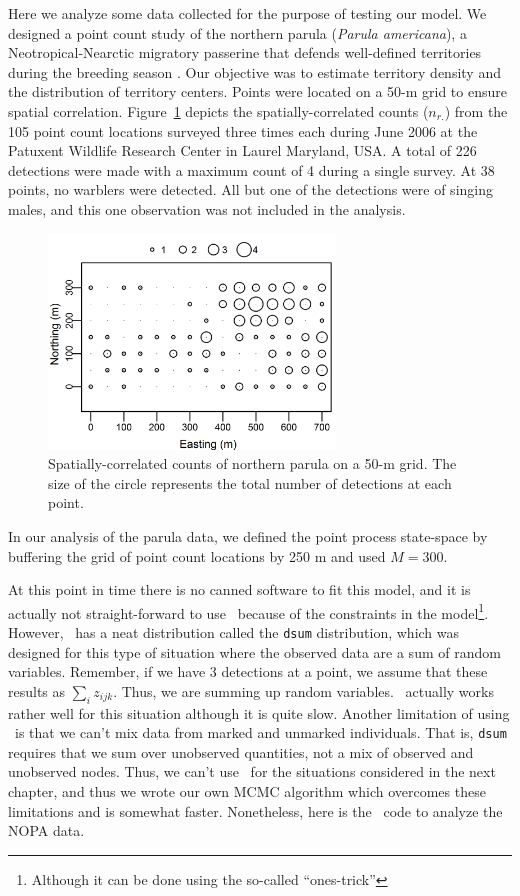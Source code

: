 Here we analyze some data collected for the purpose of testing our
model. We designed a point
count study of the northern parula ({\it Parula americana}), a
Neotropical-Nearctic migratory passerine that defends
well-defined territories during the breeding season
\citep{moldenhaer_regelski:1996}. Our objective was to
estimate territory density and the distribution of territory centers. Points
were located on a 50-m grid to ensure spatial
correlation. Figure~\ref{fig:nopaDat} depicts the spatially-correlated
counts ($n_{r.}$) from the 105 point count locations
surveyed three times each during June 2006
at the Patuxent Wildlife Research Center in Laurel Maryland, USA.
A total of 226 detections were made with a maximum count of 4 during a
single survey. At 38 points, no warblers were detected. All but one of
the detections were of singing males, and this one observation was
not included in the analysis.


\begin{figure}
  \centering
  \includegraphics[width=3in,height=2.25in]{Ch14/figs/nopa}
  \caption{Spatially-correlated counts of northern parula on a 50-m
    grid. The size of the circle represents the total number of
    detections at each point.}
  \label{fig:nopaDat}
\end{figure}



In our analysis of the parula data, we defined the point process
state-space by buffering the grid of point
count locations by 250 m and used $M=300$.

At this point in time there is no canned software to fit this model,
and it is actually not straight-forward to use \bugs~because of the
constraints in the model\footnote{Although it can be done using the
  so-called ``ones-trick''}. However, \jags~has a neat distribution
called the \verb+dsum+ distribution, which was designed for this type
of situation where the observed data are a sum of random
variables. Remember, if we have 3 detections at a point, we assume
that these results as $\sum_i z_{ijk}$. Thus, we are summing up random
variables. \jags~actually works rather well for this situation
although it is quite slow. Another limitation of using \jags~is that
we can't mix data from marked and unmarked individuals. That is,
\verb+dsum+ requires that we sum over unobserved quantities, not a mix
of observed and unobserved nodes. Thus, we can't use \jags~for the
situations considered in the next chapter, and thus we wrote our own
MCMC algorithm which overcomes these limitations and is somewhat
faster. Nonetheless, here is the \jags~code to analyze the NOPA data.

